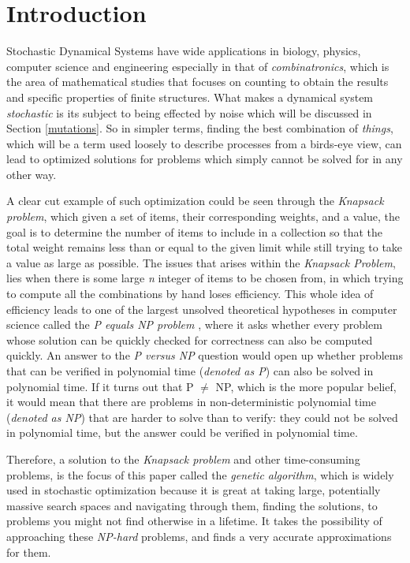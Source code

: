 \section{Introduction}
\label{sec:introduction}

Stochastic Dynamical Systems have wide applications in biology, physics, computer science and engineering especially in that of \emph{combinatronics}, which is the area of mathematical studies that focuses on counting to obtain the results and specific properties of finite structures. 
What makes a dynamical system \emph{stochastic} is its subject to being effected by noise which will be discussed in Section \ref{mutations}.  
So in simpler terms, finding the best combination of \emph{things}, which will be a term used loosely to describe processes from a birds-eye view, can lead to optimized solutions for problems which simply cannot be solved for in any other way. 
 
A clear cut example of such optimization could be seen through the \emph{Knapsack problem}, which given a set of items, their corresponding weights, and a value, the goal is to determine the number of items to include in a collection so that the total weight remains less than or equal to the given limit while still trying to take a value as large as possible. 
The issues that arises within the \emph{Knapsack Problem}, lies when there is some large \emph{n} integer of items to be chosen from, in which trying to compute all the combinations by hand loses efficiency. 
This whole idea of efficiency leads to one of the largest unsolved theoretical hypotheses in computer science called the \emph{P equals NP problem} \cite{Fortnow}, where it asks whether every problem whose solution can be quickly checked for correctness can also be computed quickly.
An answer to the \emph{P versus NP} question would open up whether problems that can be verified in polynomial time (\emph{denoted as P}) can also be solved in polynomial time. If it turns out that P $\neq$ NP, which is the more popular belief, it would mean that there are problems in non-deterministic polynomial time (\emph{denoted as NP}) that are harder to solve than to verify: they could not be solved in polynomial time, but the answer could be verified in polynomial time. 

Therefore, a solution to the \emph{Knapsack problem} and other time-consuming problems, is the focus of this paper called the \emph{genetic algorithm}, which is widely used in stochastic optimization because it is great at taking large, potentially massive search spaces and navigating through them, finding the solutions, to problems you might not find otherwise in a lifetime. It takes the possibility of approaching these \emph{NP-hard} problems, and finds a very accurate approximations for them.

